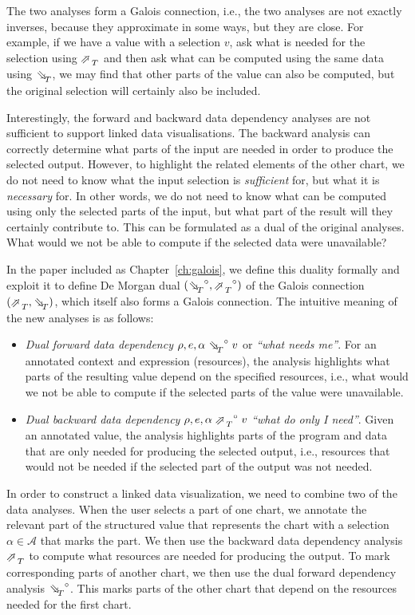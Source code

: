 \documentclass[fleqn,11pt]{report}
\theoremstyle{definition}
\newenvironment{nitemize}
{ \vspace{-0.4em}
  \begin{itemize}
    \setlength{\itemsep}{5pt}
    \setlength{\parskip}{0pt}
    \setlength{\parsep}{0pt} }
{ \end{itemize}
  \vspace{-0.4em} }
\begin{document}
The two analyses form a Galois connection, i.e., the two analyses are not exactly inverses,
because they approximate in some ways, but they are close. For example, if we have a value with
a selection $v$, ask what is needed for the selection using $\evalBwdR{T}$ and then ask
what can be computed using the same data using $\evalFwdR{T}$, we may find that other parts of
the value can also be computed, but the original selection will certainly also be included.

Interestingly, the forward and backward data dependency analyses are not sufficient to
support linked data visualisations. The backward analysis can correctly determine what parts of
the input are needed in order to produce the selected output. However, to highlight the related
elements of the other chart, we do not need to know what the input selection is \emph{sufficient}
for, but what it is \emph{necessary} for. In other words, we do not need to know what can be
computed using only the selected parts of the input, but what part of the result will they
certainly contribute to. This can be formulated as a dual of the original analyses. What would we
not be able to compute if the selected data were unavailable?

In the paper included as Chapter~\ref{ch:galois}, we define this duality formally and exploit
it to define De Morgan dual $(\dual{\evalFwdR{T}}, \dual{\evalBwdR{T}})$ of the Galois
connection $(\evalBwdR{T}, \evalFwdR{T})$, which itself also forms a Galois connection.
The intuitive meaning of the new analyses is as follows:

\begin{nitemize}
\item \emph{Dual forward data dependency} $\rho, e, \alpha\; \dual{\evalFwdR{T}}\; v$ or \emph{``what needs me''}.
  For an annotated context and expression (resources), the analysis highlights what
  parts of the resulting value depend on the specified resources, i.e., what would we not be
  able to compute if the selected parts of the value were unavailable.
\item \emph{Dual backward data dependency} $\rho, e, \alpha\; \dual{\evalBwdR{T}}\; v$ \emph{``what do only I need''}.
  Given an annotated value, the analysis highlights parts of the program and data
  that are only needed for producing the selected output, i.e., resources that
  would not be needed if the selected part of the output was not needed.
\end{nitemize}

In order to construct a linked data visualization, we need to combine two of the data analyses.
When the user selects a part of one chart, we annotate the relevant part of the structured value
that represents the chart with a selection $\alpha \in \mathcal{A}$ that marks the part.
We then use the backward data dependency analysis $\evalBwdR{T}$ to compute what resources are needed
for producing the output. To mark corresponding parts of another chart, we then use the
dual forward dependency analysis $\dual{\evalFwdR{T}}$. This marks parts of the other chart
that depend on the resources needed for the first chart.
\end{document}
